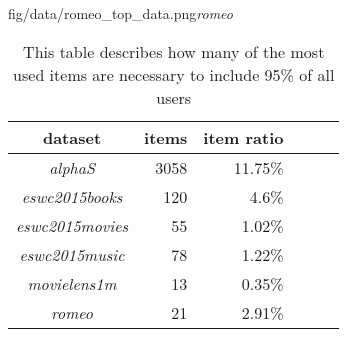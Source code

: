 {fig/data/romeo_top_data.png}{\textit{romeo}}


\begin{table}[h!]
    \centering
    \begin{tabular}{| c | r | r | r | r | l |}
        \hline
        \textbf{dataset}        & \textbf{items}  & \textbf{item ratio} \\ \hline

        \textit{alphaS}         &   3058          & 11.75\%             \\ \hline
        \textit{eswc2015books}  &   120           & 4.6\%                \\ \hline
        \textit{eswc2015movies} &   55            & 1.02\%               \\ \hline
        \textit{eswc2015music}  &   78            & 1.22\%               \\ \hline
        \textit{movielens1m}    &   13            & 0.35\%               \\ \hline
        \textit{romeo}          &   21            & 2.91\%               \\ \hline

    \end{tabular}
    \caption{This table describes how many of the most used items are necessary to include 95\% of all users}
    \label{tab:top_data}
\end{table}

\FloatBarrier
